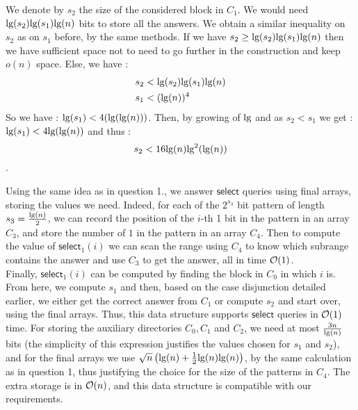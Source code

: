 \documentclass{cours}
\begin{document}
We denote by $s_{2}$ the size of the considered block in $C_{1}$. We would need $\textmd{lg}(s_{2})\textmd{lg}(s_{1})\textmd{lg}(n)$ bits to store all the answers. We obtain a similar inequality on $s_{2}$ as on $s_{1}$ before, by the same methods. If we have $s_{2} \geq \textmd{lg}(s_{2})\textmd{lg}(s_{1})\textmd{lg}(n)$ then we have sufficient space not to need to go further in the construction and keep $o(n)$ space. Else, we have : 
\[
    \begin{aligned}
        s_{2} &<\textmd{lg}(s_{2})\textmd{lg}(s_{1})\textmd{lg}(n)\\
        s_{1} &< (\textmd{lg}(n))^{4}
    \end{aligned}    
\]
So we have : $\textmd{lg}(s_{1}) < 4(\textmd{lg}(\textmd{lg}(n)))$. 
Then, by growing of $\textmd{lg}$ and as $s_{2} < s_{1}$ we get : $\textmd{lg}(s_{1}) < 4 \textmd{lg}(\textmd{lg}(n))$ and thus : \[s_{2} < 16 \textmd{lg}(n) \textmd{lg}^{2}(\textmd{lg}(n))\].

Using the same idea as in question 1., we answer $\textsf{select}$ queries using final arrays, storing the values we need. Indeed, for each of the $2^{s_{3}}$ bit pattern of length $s_{3} = \frac{\textmd{lg}(n)}{2}$, we can record the position of the $i$-th 1 bit in the pattern in an array $C_{3}$, and store the number of $1$ in the pattern in an array $C_{4}$. Then to compute the value of $\textsf{select}_{1}(i)$ we can scan the range using $C_{4}$ to know which subrange contains the answer and use $C_{3}$ to get the answer, all in time $\mathcal{O}(1)$.\\

Finally, $\textsf{select}_{1}(i)$ can be computed by finding the block in $C_{0}$ in which $i$ is. From here, we compute $s_{1}$ and then, based on the case disjunction detailed earlier, we either get the correct answer from $C_{1}$ or compute $s_{2}$ and start over, using the final arrays. Thus, this data structure supports $\textsf{select}$ queries in $\mathcal{O}(1)$ time. 
For storing the auxiliary directories $C_{0}, C_{1}$ and $C_{2}$, we need at most $\frac{3n}{\textmd{lg}(n)}$ bits (the simplicity of this expression justifies the values chosen for $s_{1}$ and $s_{2}$), and for the final arrays we use $\sqrt{n}\left(\textmd{lg}(n) + \frac{1}{2}\textmd{lg}(n)\textmd{lg}(n)\right)$, by the same calculation as in question 1, thus justifying the choice for the size of the patterns in $C_{4}$. The extra storage is in $\mathcal{O}(n)$, and this data structure is compatible with our requirements.
\end{document}
